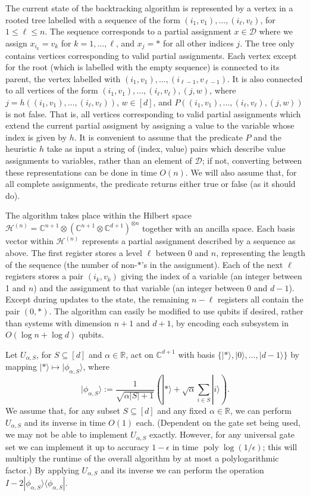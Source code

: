 \documentclass[11pt]{article}
\newcommand{\R}{\mathbb{R}}
\newcommand{\C}{\mathbb{C}}
\newcommand{\ket}[1]{| #1 \rangle}
\newcommand{\proj}[1]{| #1 \rangle \langle #1 |}
\DeclareMathOperator{\poly}{poly}
\begin{document}
The current state of the backtracking algorithm is represented by a vertex in a rooted tree labelled with a sequence of the form $(i_1,v_1),\dots,(i_\ell,v_\ell)$, for $1 \le \ell \le n$. The sequence corresponds to a partial assignment $x \in \mathcal{D}$ where we assign $x_{i_k} = v_k$ for $k=1,\dots,\ell$, and $x_j = \ast$ for all other indices $j$. The tree only contains vertices corresponding to valid partial assignments. Each vertex except for the root (which is labelled with the empty sequence) is connected to its parent, the vertex labelled with $(i_1,v_1),\dots,(i_{\ell-1},v_{\ell-1})$. It is also connected to all vertices of the form $(i_1,v_1),\dots,(i_\ell,v_\ell),(j,w)$, where $j = h((i_1,v_1),\dots,(i_\ell,v_\ell))$, $w \in [d]$, and $P((i_1,v_1),\dots,(i_\ell,v_\ell),(j,w))$ is not false. That is, all vertices corresponding to valid partial assignments which extend the current partial assigment by assigning a value to the variable whose index is given by $h$. It is convenient to assume that the predicate $P$ and the heuristic $h$ take as input a string of (index, value) pairs which describe value assignments to variables, rather than an element of $\mathcal{D}$; if not, converting between these representations can be done in time $O(n)$. We will also assume that, for all complete assignments, the predicate returns either true or false (as it should do).

The algorithm takes place within the Hilbert space $\mathcal{H}^{(n)} = \C^{n+1} \otimes (\C^{n+1} \otimes \C^{d+1})^{\otimes n}$ together with an ancilla space. Each basis vector within $\mathcal{H}^{(n)}$ represents a partial assignment described by a sequence as above. The first register stores a level $\ell$ between 0 and $n$, representing the length of the sequence (the number of non-$\ast$'s in the assignment). Each of the next $\ell$ registers stores a pair $(i_k,v_k)$ giving the index of a variable (an integer between 1 and $n$) and the assignment to that variable (an integer between 0 and $d-1$). Except during updates to the state, the remaining $n-\ell$ registers all contain the pair $(0,\ast)$. The algorithm can easily be modified to use qubits if desired, rather than systems with dimension $n+1$ and $d+1$, by encoding each subsystem in $O(\log n + \log d)$ qubits.

Let $U_{\alpha,S}$, for $S \subseteq [d]$ and $\alpha \in \R$, act on $\C^{d+1}$ with basis $\{ \ket{\ast},\ket{0},\dots,\ket{d-1} \}$ by mapping $\ket{\ast} \mapsto \ket{\phi_{\alpha,S}}$, where
%
\[ \ket{\phi_{\alpha,S}} := \frac{1}{\sqrt{\alpha |S|+1}} \left(\ket{\ast} + \sqrt{\alpha} \sum_{i \in S} \ket{i} \right). \]
%
We assume that, for any subset $S \subseteq [d]$ and any fixed $\alpha \in \R$, we can perform $U_{\alpha,S}$ and its inverse in time $O(1)$ each. (Dependent on the gate set being used, we may not be able to implement $U_{\alpha,S}$ exactly. However, for any universal gate set we can implement it up to accuracy $1-\epsilon$ in time $\poly \log (1/\epsilon)$; this will multiply the runtime of the overall algorithm by at most a polylogarithmic factor.) By applying $U_{\alpha,S}$ and its inverse we can perform the operation $I - 2 \proj{\phi_{\alpha,S}}$.
\end{document}
